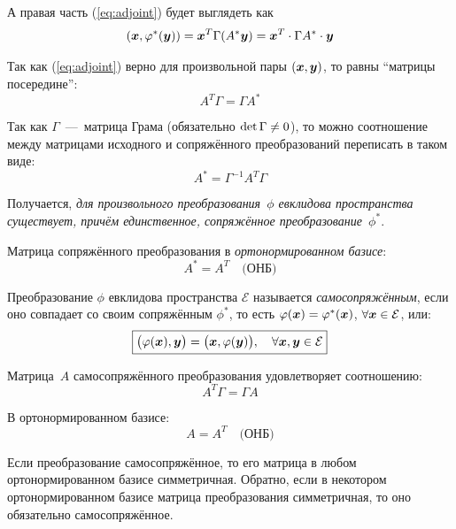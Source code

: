 \documentclass[a4paper,12pt]{article}
\theoremstyle{remark}
\begin{document}
  А правая часть (\ref{eq:adjoint}) будет выглядеть как
  \[
    (\boldsymbol x, \varphi^*(\boldsymbol y)) = \boldsymbol x^T \Gamma (A^* \boldsymbol y) = \boldsymbol x^T \cdot \Gamma A^* \cdot \boldsymbol y
  \]
  
  Так как (\ref{eq:adjoint}) верно для произвольной пары $(\boldsymbol x, \boldsymbol y)$, то равны ``матрицы посередине'':
  \begin{equation}
    \boxed{A^T \Gamma = \Gamma A^*}
  \end{equation}
  
  Так как $\Gamma$~---~матрица Грама (обязательно $\det \Gamma \hm{\not=} 0$), то можно соотношение между матрицами исходного и сопряжённого преобразований переписать в таком виде:
  \[
    A^* = \Gamma^{-1} A^T \Gamma
  \]
  
  Получается, \emph{для произвольного преобразования~$\phi$ евклидова пространства существует, причём единственное, сопряжённое преобразование~$\phi^*$}.
  
  Матрица сопряжённого преобразования в \emph{ортонормированном базисе}:
  \[
    A^* = A^T\quad \mbox{(ОНБ)}
  \]
  
  \medskip
  
  Преобразование $\phi$ евклидова пространства $\mathcal E$ называется \emph{самосопряжённым}, если оно совпадает со своим сопряжённым $\phi^*$, то есть $\phi(\bds x) \hm= \phi^*(\bds x)$, $\forall \bds x \hm\in \mathcal E$, или:
  \begin{equation}\label{eq:self-adjoint-def}
    \boxed{
      \bigl(\varphi(\boldsymbol x), \boldsymbol y\bigr) = \bigl(\boldsymbol x, \varphi(\boldsymbol y)\bigr),\quad \forall \boldsymbol x, \boldsymbol y \in \mathcal E
    }
  \end{equation}
  
  Матрица~$A$ самосопряжённого преобразования удовлетворяет соотношению:
  \begin{equation}\label{eq:self-adjoint}
    A^T \Gamma = \Gamma A
  \end{equation}
  
  В ортонормированном базисе:
  \begin{equation}\label{eq:self-adjoint-onb}
    \boxed{A = A^T\quad \mbox{(ОНБ)}}
  \end{equation}
  
  \begin{proposition}
    Если преобразование самосопряжённое, то его матрица в любом ортонормированном базисе симметричная.
    Обратно, если в некотором ортонормированном базисе матрица преобразования симметричная, то оно обязательно самосопряжённое.
  \end{proposition}
  
\end{document}
